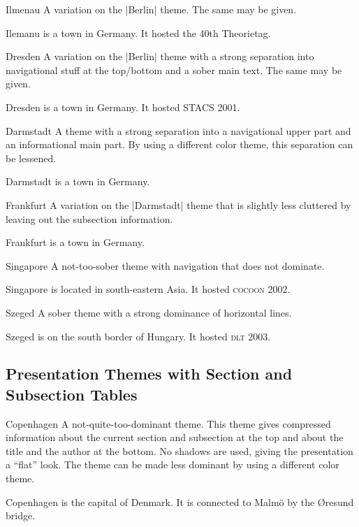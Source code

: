 \begin{themeexample}{Ilmenau}
  A variation on the |Berlin| theme. The same  may be given.

  Ilemanu is a town in Germany. It hosted the 40th Theorietag.
\end{themeexample}

\begin{themeexample}{Dresden}
  A variation on the |Berlin| theme with a strong separation into navigational stuff at the top/bottom and a sober main text. The same  may be given.

  Dresden is a town in Germany. It hosted STACS 2001.
\end{themeexample}


\begin{themeexample}{Darmstadt}
  A theme with a strong separation into a navigational upper part and an informational main part. By using a different color theme, this separation can be lessened.

  Darmstadt is a town in Germany.
\end{themeexample}

\begin{themeexample}{Frankfurt}
  A variation on the |Darmstadt| theme that is slightly less cluttered by leaving out the subsection information.

  Frankfurt is a town in Germany.
\end{themeexample}

\begin{themeexample}{Singapore}
  A not-too-sober theme with navigation that does not dominate.

  Singapore is located in south-eastern Asia. It hosted \textsc{cocoon} 2002.
\end{themeexample}

\begin{themeexample}{Szeged}
  A sober theme with a strong dominance of horizontal lines.

  Szeged is on the south border of Hungary. It hosted \textsc{dlt} 2003.
\end{themeexample}


\subsection{Presentation Themes with Section and Subsection Tables}

\begin{themeexample}{Copenhagen}
  A not-quite-too-dominant theme. This theme gives compressed information about the current section and subsection at the top and about the title and the author at the bottom. No shadows are used, giving the presentation a ``flat'' look. The theme can be made less dominant by using a different color theme.

  Copenhagen is the capital of Denmark. It is connected to Malm\"o by the \O resund bridge.
\end{themeexample}

